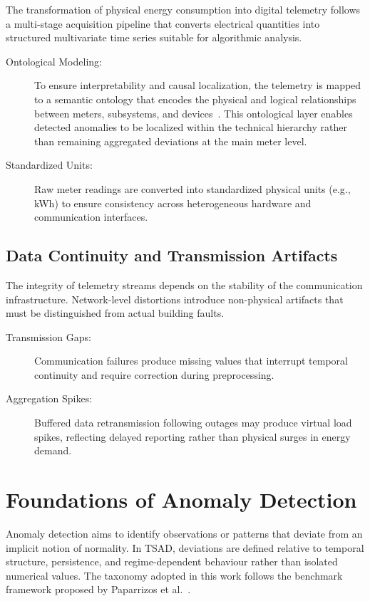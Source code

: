 The transformation of physical energy consumption into digital telemetry follows a multi-stage acquisition pipeline that converts electrical quantities into structured multivariate time series suitable for algorithmic analysis.

\begin{description}
	\item[Ontological Modeling:] To ensure interpretability and causal localization, the telemetry is mapped to a semantic ontology that encodes the physical and logical relationships between meters, subsystems, and devices~\cite{ElionaOntologies}. This ontological layer enables detected anomalies to be localized within the technical hierarchy rather than remaining aggregated deviations at the main meter level.
	\item[Standardized Units:] Raw meter readings are converted into standardized physical units (e.g., kWh) to ensure consistency across heterogeneous hardware and communication interfaces.
\end{description}

\subsection{Data Continuity and Transmission Artifacts}
\label{subsec:communication-artifacts}

The integrity of telemetry streams depends on the stability of the communication infrastructure. Network-level distortions introduce non-physical artifacts that must be distinguished from actual building faults.

\begin{description}
	\item[Transmission Gaps:] Communication failures produce missing values that interrupt temporal continuity and require correction during preprocessing.
	\item[Aggregation Spikes:] Buffered data retransmission following outages may produce virtual load spikes, reflecting delayed reporting rather than physical surges in energy demand.
\end{description}

\section{Foundations of Anomaly Detection}
\label{sec:fundamentals-anomaly-detection}

Anomaly detection aims to identify observations or patterns that deviate from an implicit notion of normality. In  \ac{TSAD}, deviations are defined relative to temporal structure, persistence, and regime-dependent behaviour rather than isolated numerical values. The taxonomy adopted in this work follows the benchmark framework proposed by Paparrizos et al.~\cite{paparrizos2022tsb}.

